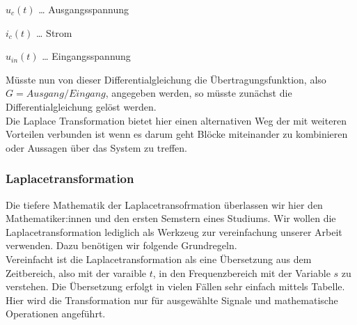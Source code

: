 \documentclass[
  letterpaper,
  DIV=11]{scrreprt}
\begin{document}
\(u_{c}{\left(t \right)}\) \ldots{} Ausgangsspannung

\(i_{c}{\left(t \right)}\) \ldots{} Strom

\(u_{in}{\left(t \right)}\) \ldots{} Eingangsspannung

Müsste nun von dieser Differentialgleichung die Übertragungsfunktion,
also \(G=Ausgang/Eingang\), angegeben werden, so müsste zunächst die
Differentialgleichung gelöst werden.\\
Die Laplace Transformation bietet hier einen alternativen Weg der mit
weiteren Vorteilen verbunden ist wenn es darum geht Blöcke miteinander
zu kombinieren oder Aussagen über das System zu treffen.

\subsubsection{Laplacetransformation}\label{laplacetransformation}

Die tiefere Mathematik der Laplacetransofrmation überlassen wir hier den
Mathematiker:innen und den ersten Semstern eines Studiums. Wir wollen
die Laplacetransformation lediglich als Werkzeug zur vereinfachung
unserer Arbeit verwenden. Dazu benötigen wir folgende Grundregeln.\\
Vereinfacht ist die Laplacetransformation als eine Übersetzung aus dem
Zeitbereich, also mit der varaible \(t\), in den Frequenzbereich mit der
Variable \(s\) zu verstehen. Die Übersetzung erfolgt in vielen Fällen
sehr einfach mittels Tabelle. Hier wird die Transformation nur für
ausgewählte Signale und mathematische Operationen angeführt.
\end{document}
